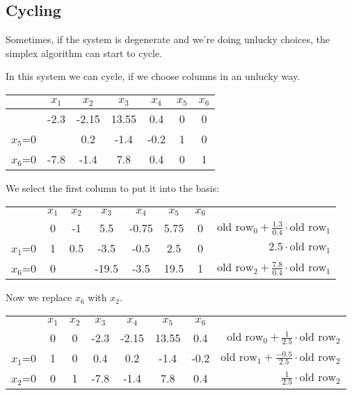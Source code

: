 \subsection{Cycling}

Sometimes, if the system is degenerate and we're doing unlucky choices, the simplex algorithm can start to cycle.

\begin{Ex}[Cycling]\label{Ex:cycling} In this system we can cycle, if we choose columns in an unlucky way.
\begin{center}
\begin{tabular}{c|cccccc}
    & $x_1$ & $x_2$ & $x_3$ & $x_4$ & $x_5$ & $x_6$\\\hline
    & -2.3 & -2.15 & 13.55 & 0.4 & 0 & 0\\\hline
$x_5$=0 & \cellcolor{gruen}{\bf 0.4} & 0.2 & -1.4 & -0.2 & 1 & 0 \\
$x_6$=0 & -7.8 & -1.4 & 7.8 & 0.4 & 0 & 1\\
\end{tabular}
\end{center}

We select the first column to put it into the basis:

\begin{center}
\begin{tabular}{c|ccccccr}
    & $x_1$ & $x_2$ & $x_3$ & $x_4$ & $x_5$ & $x_6$\\\cline{1-7}
    & 0 & -1 & 5.5 & -0.75 & 5.75 & 0&\hspace{1cm} $\text{old row}_0 + \frac{1.3}{0.4}\cdot \text{old row}_1$\\\cline{1-7}
$x_1$=0 & 1 & 0.5 & -3.5 & -0.5 & 2.5 & 0 &\hspace{1cm} $2.5 \cdot \text{old row}_1$\\
$x_6$=0 & 0 & \cellcolor{gruen}{\bf 2.5} & -19.5 & -3.5 & 19.5 & 1&\hspace{1cm} $\text{old row}_2 + \frac{7.8}{0.4}\cdot \text{old row}_1$\\
\end{tabular}
\end{center}

Now we replace $x_6$ with $x_2$.

\begin{center}
\begin{tabular}{c|ccccccr}
    & $x_1$ & $x_2$ & $x_3$ & $x_4$ & $x_5$ & $x_6$\\\cline{1-7}
    & 0 & 0 & -2.3 & -2.15 & 13.55 & 0.4&\hspace{1cm} $\text{old row}_0 + \frac{1}{2.5}\cdot \text{old row}_2$\\\cline{1-7}
$x_1$=0 & 1 & 0 & 0.4 & 0.2 & -1.4 & -0.2&\hspace{1cm} $\text{old row}_1 + \frac{-0.5}{2.5}\cdot \text{old row}_2$ \\
$x_2$=0 & 0 & 1 & -7.8 & -1.4 & 7.8 & 0.4&\hspace{1cm} $\frac{1}{2.5} \cdot \text{old row}_2$\\
\end{tabular}
\end{center}


\end{Ex}
